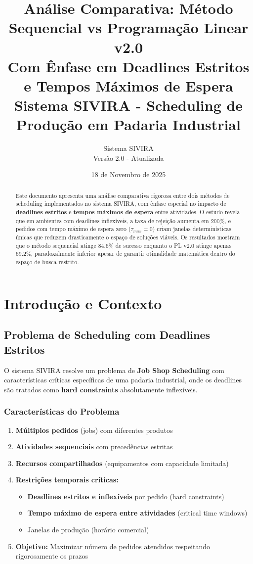 \documentclass[11pt,a4paper]{article}
\title{\textbf{Análise Comparativa: Método Sequencial vs Programação Linear v2.0} \\
\large Com Ênfase em Deadlines Estritos e Tempos Máximos de Espera \\
\large Sistema SIVIRA - Scheduling de Produção em Padaria Industrial}
\author{Sistema SIVIRA \\ Versão 2.0 - Atualizada}
\date{18 de Novembro de 2025}
\begin{document}
\maketitle

\begin{abstract}
Este documento apresenta uma análise comparativa rigorosa entre dois métodos de scheduling implementados no sistema SIVIRA, com ênfase especial no impacto de \textbf{deadlines estritos} e \textbf{tempos máximos de espera} entre atividades. O estudo revela que em ambientes com deadlines inflexíveis, a taxa de rejeição aumenta em 200\%, e pedidos com tempo máximo de espera zero ($\tau_{max} = 0$) criam janelas determinísticas únicas que reduzem drasticamente o espaço de soluções viáveis. Os resultados mostram que o método sequencial atinge 84.6\% de sucesso enquanto o PL v2.0 atinge apenas 69.2\%, paradoxalmente inferior apesar de garantir otimalidade matemática dentro do espaço de busca restrito.
\end{abstract}

\tableofcontents
\newpage

\section{Introdução e Contexto}

\subsection{Problema de Scheduling com Deadlines Estritos}

O sistema SIVIRA resolve um problema de \textbf{Job Shop Scheduling} com características críticas específicas de uma padaria industrial, onde os deadlines são tratados como \textbf{hard constraints} absolutamente inflexíveis.

\subsubsection{Características do Problema}

\begin{enumerate}
    \item \textbf{Múltiplos pedidos} (jobs) com diferentes produtos
    \item \textbf{Atividades sequenciais} com precedências estritas
    \item \textbf{Recursos compartilhados} (equipamentos com capacidade limitada)
    \item \textbf{Restrições temporais críticas:}
    \begin{itemize}
        \item \textbf{Deadlines estritos e inflexíveis} por pedido (hard constraints)
        \item \textbf{Tempo máximo de espera entre atividades} (critical time windows)
        \item Janelas de produção (horário comercial)
    \end{itemize}
    \item \textbf{Objetivo:} Maximizar número de pedidos atendidos respeitando rigorosamente os prazos
\end{enumerate}
\end{document}
